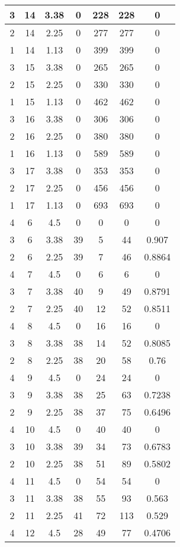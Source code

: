 \documentclass[letterpaper, 12pt]{article}
\begin{document}
\begin{longtable}{|c|c|c|c|c|c|c|}
\hline
3 & 14 & 3.38 & 0 & 228 & 228 & 0 \\
\hline
2 & 14 & 2.25 & 0 & 277 & 277 & 0 \\
\hline
1 & 14 & 1.13 & 0 & 399 & 399 & 0 \\
\hline
3 & 15 & 3.38 & 0 & 265 & 265 & 0 \\
\hline
2 & 15 & 2.25 & 0 & 330 & 330 & 0 \\
\hline
1 & 15 & 1.13 & 0 & 462 & 462 & 0 \\
\hline
3 & 16 & 3.38 & 0 & 306 & 306 & 0 \\
\hline
2 & 16 & 2.25 & 0 & 380 & 380 & 0 \\
\hline
1 & 16 & 1.13 & 0 & 589 & 589 & 0 \\
\hline
3 & 17 & 3.38 & 0 & 353 & 353 & 0 \\
\hline
2 & 17 & 2.25 & 0 & 456 & 456 & 0 \\
\hline
1 & 17 & 1.13 & 0 & 693 & 693 & 0 \\
\hline
4 & 6 & 4.5 & 0 & 0 & 0 & 0 \\
\hline
3 & 6 & 3.38 & 39 & 5 & 44 & 0.907 \\
\hline
2 & 6 & 2.25 & 39 & 7 & 46 & 0.8864 \\
\hline
4 & 7 & 4.5 & 0 & 6 & 6 & 0 \\
\hline
3 & 7 & 3.38 & 40 & 9 & 49 & 0.8791 \\
\hline
2 & 7 & 2.25 & 40 & 12 & 52 & 0.8511 \\
\hline
4 & 8 & 4.5 & 0 & 16 & 16 & 0 \\
\hline
3 & 8 & 3.38 & 38 & 14 & 52 & 0.8085 \\
\hline
2 & 8 & 2.25 & 38 & 20 & 58 & 0.76 \\
\hline
4 & 9 & 4.5 & 0 & 24 & 24 & 0 \\
\hline
3 & 9 & 3.38 & 38 & 25 & 63 & 0.7238 \\
\hline
2 & 9 & 2.25 & 38 & 37 & 75 & 0.6496 \\
\hline
4 & 10 & 4.5 & 0 & 40 & 40 & 0 \\
\hline
3 & 10 & 3.38 & 39 & 34 & 73 & 0.6783 \\
\hline
2 & 10 & 2.25 & 38 & 51 & 89 & 0.5802 \\
\hline
4 & 11 & 4.5 & 0 & 54 & 54 & 0 \\
\hline
3 & 11 & 3.38 & 38 & 55 & 93 & 0.563 \\
\hline
2 & 11 & 2.25 & 41 & 72 & 113 & 0.529 \\
\hline
4 & 12 & 4.5 & 28 & 49 & 77 & 0.4706 \\

\end{longtable}
\end{document}
